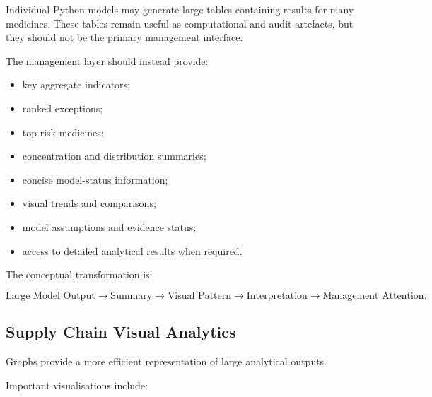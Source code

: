 \documentclass[12pt]{article}
\begin{document}
Individual Python models may generate large tables containing results for many
medicines. These tables remain useful as computational and audit artefacts,
but they should not be the primary management interface.

The management layer should instead provide:

\begin{itemize}
    \item key aggregate indicators;
    \item ranked exceptions;
    \item top-risk medicines;
    \item concentration and distribution summaries;
    \item concise model-status information;
    \item visual trends and comparisons;
    \item model assumptions and evidence status;
    \item access to detailed analytical results when required.
\end{itemize}

The conceptual transformation is:

\[
\text{Large Model Output}
\rightarrow
\text{Summary}
\rightarrow
\text{Visual Pattern}
\rightarrow
\text{Interpretation}
\rightarrow
\text{Management Attention}.
\]

\subsection{Supply Chain Visual Analytics}

Graphs provide a more efficient representation of large analytical outputs.

Important visualisations include:
\end{document}
